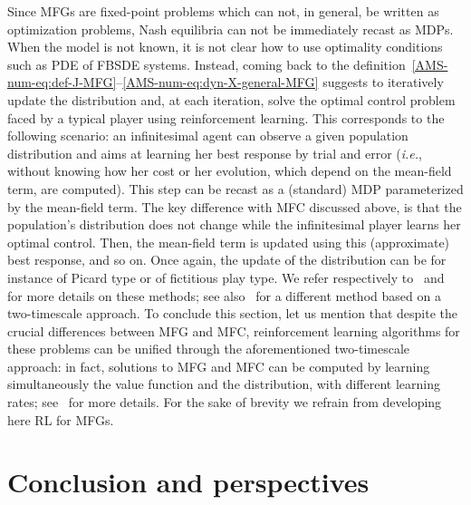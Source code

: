 \documentclass{amsproc}
\theoremstyle{definition}
\theoremstyle{remark}
\numberwithin{equation}{section}
\begin{document}
Since MFGs are fixed-point problems which can not, in general, be written as optimization problems, Nash equilibria can not be immediately recast as MDPs. When the model is not known, it is not clear how to use optimality conditions such as PDE of FBSDE systems. Instead, coming back to the definition~\eqref{AMS-num-eq:def-J-MFG}--\eqref{AMS-num-eq:dyn-X-general-MFG} suggests to iteratively update the distribution and, at each iteration, solve the optimal control problem faced by a typical player using reinforcement learning. This corresponds to the following scenario: an infinitesimal agent can observe a given population distribution and aims at learning her best response by trial and error (\textit{i.e.}, without knowing how her cost or her evolution, which depend on the mean-field term, are computed). This step can be recast as a (standard) MDP parameterized by the mean-field term. The key difference with MFC discussed above, is that the population's distribution does not change while the infinitesimal player learns her optimal control. Then, the mean-field term is updated using this (approximate) best response, and so on. Once again, the update of the distribution can be for instance of Picard type or of fictitious play type. We refer respectively to~\cite{guo2019learning} and~\cite{Elie2020OnTC,perrin2020fictitious} for more details on these methods; see also~\cite{subramanianpolicy} for a different method based on a two-timescale approach. To conclude this section, let us mention that despite the crucial differences between MFG and MFC, reinforcement learning algorithms for these problems can be unified through the aforementioned two-timescale approach: in fact, solutions to MFG and MFC can be computed by learning simultaneously the value function and the distribution, with different learning rates; see~\cite{angiulifouquelauriere2020unified} for more details. For the sake of brevity we refrain from developing here RL for MFGs.





\clearpage

\section{\bf Conclusion and perspectives}
\label{sec:conclusion}
\end{document}
